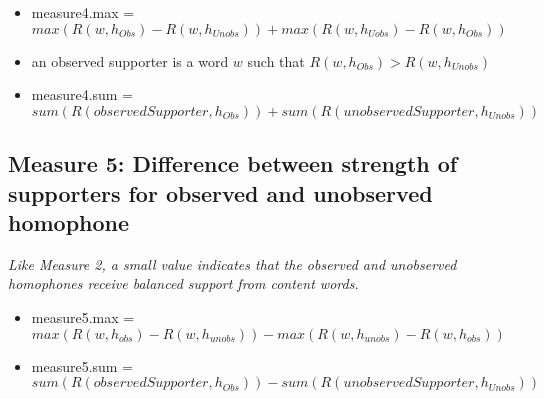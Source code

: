 \documentclass{article}
\begin{document}
\begin{itemize}
\item[] measure4.max = $max(R(w, h_{Obs}) - R(w, h_{Unobs})) + max(R(w, h_{Uobs}) - R(w, h_{Obs}))$

\item[] an observed supporter is a word $w$ such that $R(w, h_{Obs}) > R(w, h_{Unobs})$

\item[] measure4.sum = $sum(R(observedSupporter, h_{Obs})) + sum(R(unobservedSupporter, h_{Unobs}))$


\end{itemize}

\subsection*{Measure 5:  Difference between strength of supporters for observed and unobserved homophone}
\emph{Like Measure 2, a small value indicates that the observed and unobserved homophones receive balanced support from content words.}

\begin{itemize}
\item[] measure5.max = $max(R(w, h_{obs}) - R(w, h_{unobs})) - max(R(w, h_{unobs}) - R(w, h_{obs}))$
  
\item[] measure5.sum = $sum(R(observedSupporter, h_{Obs})) - sum(R(unobservedSupporter, h_{Unobs}))$
  
\end{itemize}
\end{document}
